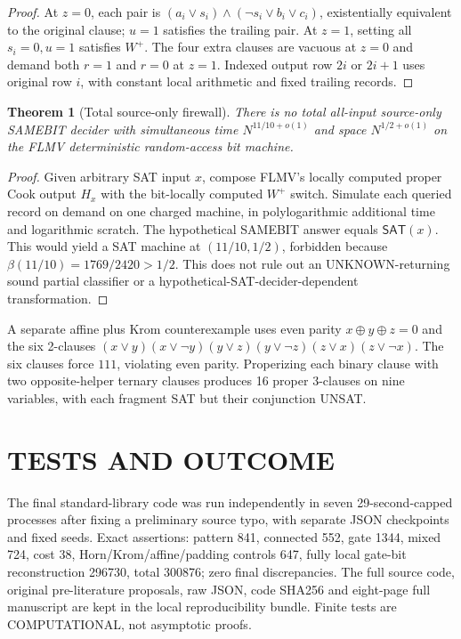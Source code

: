 \documentclass[11pt]{article}
\newtheorem{theorem}{Theorem}
\begin{document}
\begin{proof}
At \(z=0\), each pair is \((a_i\vee s_i)\land(\neg s_i\vee b_i\vee c_i)\), existentially equivalent to the original clause; \(u=1\) satisfies the trailing pair. At \(z=1\), setting all \(s_i=0,u=1\) satisfies \(W^+\). The four extra clauses are vacuous at \(z=0\) and demand both \(r=1\) and \(r=0\) at \(z=1\). Indexed output row \(2i\) or \(2i+1\) uses original row \(i\), with constant local arithmetic and fixed trailing records.
\end{proof}
\begin{theorem}[Total source-only firewall]
There is no total all-input source-only SAMEBIT decider with simultaneous time \(N^{11/10+o(1)}\) and space \(N^{1/2+o(1)}\) on the FLMV deterministic random-access bit machine.
\end{theorem}
\begin{proof}
Given arbitrary SAT input \(x\), compose FLMV's locally computed proper Cook output \(H_x\) with the bit-locally computed \(W^+\) switch. Simulate each queried record on demand on one charged machine, in polylogarithmic additional time and logarithmic scratch. The hypothetical SAMEBIT answer equals \(\mathsf{SAT}(x)\). This would yield a SAT machine at \((11/10,1/2)\), forbidden because \(\beta(11/10)=1769/2420>1/2\). This does not rule out an UNKNOWN-returning sound partial classifier or a hypothetical-SAT-decider-dependent transformation.
\end{proof}
A separate affine plus Krom counterexample uses even parity \(x\oplus y\oplus z=0\) and the six 2-clauses \((x\vee y)(x\vee\neg y)(y\vee z)(y\vee\neg z)(z\vee x)(z\vee\neg x)\). The six clauses force \(111\), violating even parity. Properizing each binary clause with two opposite-helper ternary clauses produces 16 proper 3-clauses on nine variables, with each fragment SAT but their conjunction UNSAT.
\section{TESTS AND OUTCOME}
The final standard-library code was run independently in seven 29-second-capped processes after fixing a preliminary source typo, with separate JSON checkpoints and fixed seeds. Exact assertions: pattern 841, connected 552, gate 1344, mixed 724, cost 38, Horn/Krom/affine/padding controls 647, fully local gate-bit reconstruction 296730, total 300876; zero final discrepancies. The full source code, original pre-literature proposals, raw JSON, code SHA256 and eight-page full manuscript are kept in the local reproducibility bundle. Finite tests are COMPUTATIONAL, not asymptotic proofs.
\end{document}
